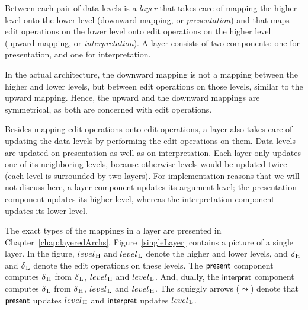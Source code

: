 \documentclass{speauth}
\begin{document}
Between each pair of data levels is a {\em layer} that takes care of mapping the higher level onto the lower level (downward mapping, or {\em presentation}) and that maps edit operations on the lower level onto edit operations on the higher level (upward mapping, or {\em interpretation}). A layer consists of two components: one for presentation, and one for interpretation. 

In the actual architecture, the downward mapping is not a mapping between the higher and lower levels, but between edit operations on those levels, similar to the upward mapping. Hence, the upward and the downward mappings are symmetrical, as both are concerned with edit operations. 

Besides mapping edit operations onto edit operations, a layer also takes care of updating the data levels by performing the edit operations on them. Data levels are updated on presentation as well as on interpretation. Each layer only updates one of its neighboring levels, because otherwise levels would be updated twice (each level is surrounded by two layers). For implementation reasons that we will not discuss here, a layer component updates its argument level; the presentation component updates its higher level, whereas the interpretation component updates its lower level. 

\bc The exact types of the mappings in a layer are presented in Chapter~\ref{chap:layeredArchs}.\ec 
Figure~\ref{singleLayer} contains a picture of a single layer. In the figure, $level_{\hspace*{0.076em} \mathrm H}$ and $level_{\hspace*{0.076em} \mathrm L}$ denote the higher and lower levels, and $\delta_{\hspace*{0.076em} \mathrm H}$ and $\delta_{\hspace*{0.076em} \mathrm L}$ denote the edit operations on these levels. The ${\mathsf {present}}$ component computes $\delta_{\hspace*{0.076em} \mathrm H}$ from $\delta_{\hspace*{0.076em} \mathrm L}$, $level_{\hspace*{0.076em} \mathrm H}$ and $level_{\hspace*{0.076em} \mathrm L}$. And, dually, the ${\mathsf {interpret}}$ component computes $\delta_{\hspace*{0.076em} \mathrm L}$ from $\delta_{\hspace*{0.076em} \mathrm H}$, $level_{\hspace*{0.076em} \mathrm L}$ and $level_{\hspace*{0.076em} \mathrm H}$. The squiggly arrows ($\leadsto$) denote that ${\mathsf {present}}$ updates $level_{\hspace*{0.076em} \mathrm H}$ and ${\mathsf {interpret}}$ updates  $level_{\hspace*{0.076em} \mathrm L}$. 
\end{document}
